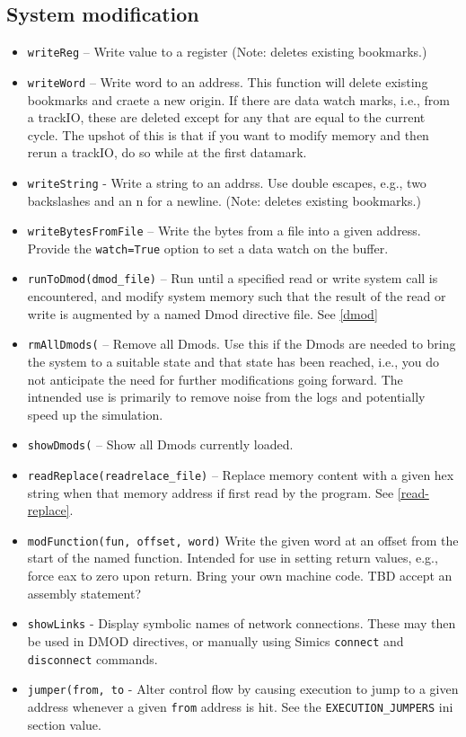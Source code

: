 \documentclass[titlepage]{article}
\begin{document}
\subsection{System modification}
\label{sec:modification}
\begin{itemize}

\item {\tt writeReg} – Write value to a register (Note: deletes existing bookmarks.)
\item {\tt writeWord} – Write word to an address. This function will delete existing bookmarks and craete a new origin.  If there are data watch marks,
i.e., from a trackIO, these are deleted except for any that are equal to the current cycle.  The upshot of this is that if you want to modify memory
and then rerun a trackIO, do so while at the first datamark.
\item {\tt writeString} - Write a string to an addrss. Use double escapes, e.g., two backslashes and an n for a newline. (Note: deletes existing bookmarks.)
\item {\tt writeBytesFromFile} – Write the bytes from a file into a given address.  Provide the {\tt watch=True} option to set a data watch on the buffer.

\item {\tt runToDmod(dmod\_file)} – Run until a specified read or write system call is encountered, and modify system memory such
that the result of the read or write is augmented by a named Dmod directive file.  See \ref{dmod}

\item {\tt rmAllDmods(} – Remove all Dmods.  Use this if the Dmods are needed to bring the system to a suitable state and that state has been reached, i.e.,
you do not anticipate the need for further modifications going forward.  The intnended use is primarily to remove noise from the logs and potentially speed
up the simulation.

\item {\tt showDmods(} – Show all Dmods currently loaded.

\item {\tt readReplace(readrelace\_file)} – Replace memory content with a given hex string when that memory address if first read by the program.
See \ref{read-replace}.

\item {\tt modFunction(fun, offset, word)} Write the given word at an offset from the start of the named function.  Intended for use in setting return
values, e.g., force eax to zero upon return.  Bring your own machine code.  TBD accept an assembly statement?

\item {\tt showLinks} - Display symbolic names of network connections.  These may then be used in DMOD directives, or manually using Simics {\tt connect}
and {\tt disconnect} commands.

\item {\tt jumper(from, to} - Alter control flow by causing execution to jump to a given address whenever a given {\tt from} address is hit.  See
the {\tt EXECUTION\_JUMPERS} ini section value.

\end{itemize}
\end{document}
